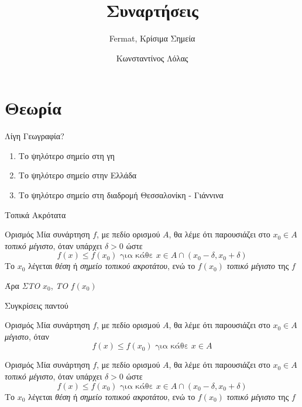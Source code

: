 \documentclass{presentation}
\title{Συναρτήσεις}
\subtitle{Fermat, Κρίσιμα Σημεία}
\author[Λόλας]{Κωνσταντίνος Λόλας}
\institute[$10^ο$ ΓΕΛ]{$10^ο$ ΓΕΛ Θεσσαλονίκης}
\date{}
\begin{document}
\begin{frame}
    \titlepage
\end{frame}

\section{Θεωρία}
\begin{frame}{Λίγη Γεωγραφία?}
    \begin{enumerate}
        \item<1-> Το ψηλότερο σημείο στη γη
        \item<2-> Το ψηλότερο σημείο στην Ελλάδα
        \item<3-> Το ψηλότερο σημείο στη διαδρομή Θεσσαλονίκη - Γιάννινα
    \end{enumerate}
\end{frame}

\begin{frame}{Τοπικά Ακρότατα}
    \begin{block}{Ορισμός}
        Μία συνάρτηση $f$, με πεδίο ορισμού $Α$, θα λέμε ότι παρουσιάζει στο $x_0\in Α$ \emph{τοπικό μέγιστο}, όταν υπάρχει $δ>0$ ώστε
        $$f(x)\le f(x_0) \text{ για κάθε } x\in Α\cap (x_0-δ,x_0+δ)$$
        Το $x_0$ λέγεται \emph{θέση} ή \emph{σημείο τοπικού ακροτάτου}, ενώ το $f(x_0)$ \emph{τοπικό μέγιστο} της $f$
    \end{block}
    Άρα \emph{ΣΤΟ} $x_0$, \emph{ΤΟ} $f(x_0)$
\end{frame}

\begin{frame}{Συγκρίσεις παντού}
    \begin{block}{Ορισμός}
        Μία συνάρτηση $f$, με πεδίο ορισμού $Α$, θα λέμε ότι παρουσιάζει στο $x_0\in Α$ \emph{μέγιστο}, όταν
        $$f(x)\le f(x_0) \text{ για κάθε } x\in Α$$
    \end{block}
    \begin{block}{Ορισμός}
        Μία συνάρτηση $f$, με πεδίο ορισμού $Α$, θα λέμε ότι παρουσιάζει στο $x_0\in Α$ \emph{τοπικό μέγιστο}, όταν υπάρχει $δ>0$ ώστε
        $$f(x)\le f(x_0) \text{ για κάθε } x\in Α\cap (x_0-δ,x_0+δ)$$
        Το $x_0$ λέγεται \emph{θέση} ή \emph{σημείο τοπικού ακροτάτου}, ενώ το $f(x_0)$ \emph{τοπικό μέγιστο} της $f$
    \end{block}
\end{frame}
\end{document}
